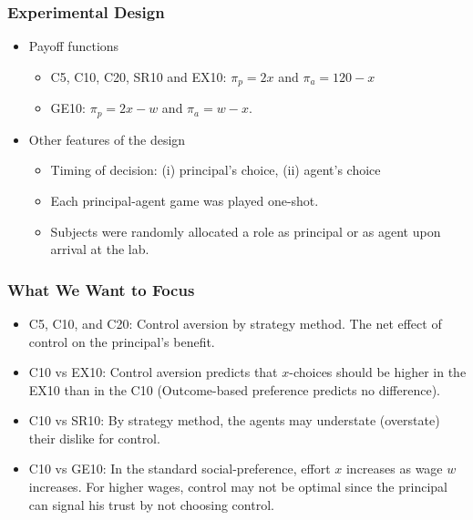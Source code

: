 \documentclass[unicode,12pt]{beamer}
\begin{document}
    \begin{frame}
        \frametitle{Experimental Design}
    
        \begin{itemize}
            \item Payoff functions
            \begin{itemize}
                \item C5, C10, C20, SR10 and EX10: $\pi_p = 2x$ and $\pi_a = 120 - x$
                \item GE10: $\pi_p = 2x - w$ and $\pi_a = w - x$.
            \end{itemize}
            \item Other features of the design
            \begin{itemize}
                \item Timing of decision: (i) principal's choice, (ii) agent's choice
                \item Each principal-agent game was played one-shot.
                \item Subjects were randomly allocated a role as principal or as agent upon arrival at the lab.
            \end{itemize}
        \end{itemize}
    
    \end{frame}

    \begin{frame}
        \frametitle{What We Want to Focus}
    
        \begin{itemize}
            \item C5, C10, and C20: Control aversion by strategy method. The net effect of control on the principal's benefit.
            \item C10 vs EX10: Control aversion predicts that $x$-choices should be higher in the EX10 than in the C10 (Outcome-based preference predicts no difference).
            \item C10 vs SR10: By strategy method, the agents may understate (overstate) their dislike for control.
            \item C10 vs GE10: In the standard social-preference, effort $x$ increases as wage $w$ increases. For higher wages, control may not be optimal since the principal can signal his trust by not choosing control.  
        \end{itemize}
    
    \end{frame}
\end{document}
